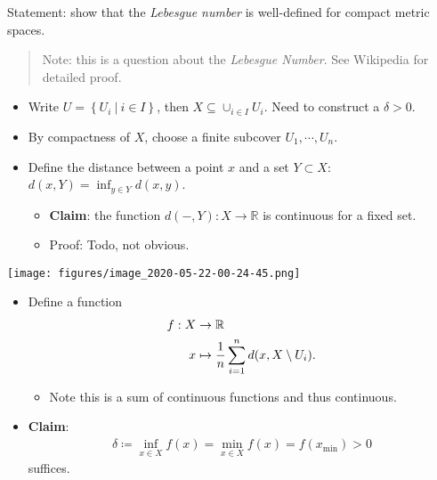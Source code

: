 \begin{solution}

\envlist

\begin{concept}

\envlist

\end{concept}

Statement: show that the \emph{Lebesgue number} is well-defined for
compact metric spaces.

\begin{quote}
Note: this is a question about the \emph{Lebesgue Number}. See Wikipedia
for detailed proof.
\end{quote}

\begin{itemize}
\tightlist
\item
  Write \(U = \left\{{U_i {~\mathrel{\Big|}~}i\in I}\right\}\), then
  \(X \subseteq \cup_{i\in I} U_i\). Need to construct a \(\delta > 0\).
\item
  By compactness of \(X\), choose a finite subcover
  \(U_1, \cdots, U_n\).
\item
  Define the distance between a point \(x\) and a set \(Y\subset X\):
  \(d(x, Y) = \inf_{y\in Y} d(x, y)\).

  \begin{itemize}
  \tightlist
  \item
    \textbf{Claim}: the function \(d({-}, Y): X\to {\mathbb{R}}\) is
    continuous for a fixed set.
  \item
    Proof: Todo, not obvious.
  \end{itemize}
\end{itemize}

\texttt{[image: figures/image\_2020-05-22-00-24-45.png]}

\begin{itemize}
\tightlist
\item
  Define a function
  \begin{align*}     f: X &\to {\mathbb{R}}\\     x &\mapsto {1\over n} \sum_{i=1}^n d(x, X\setminus U_i)      .\end{align*}

  \begin{itemize}
  \tightlist
  \item
    Note this is a sum of continuous functions and thus continuous.
  \end{itemize}
\item
  \textbf{Claim}:
  \begin{align*}\delta \coloneqq\inf_{x\in X}f(x) = \min_{x\in X}f(x) = f(x_{\text{min}}) > 0\end{align*}
  suffices.


\end{itemize}
\end{solution}
